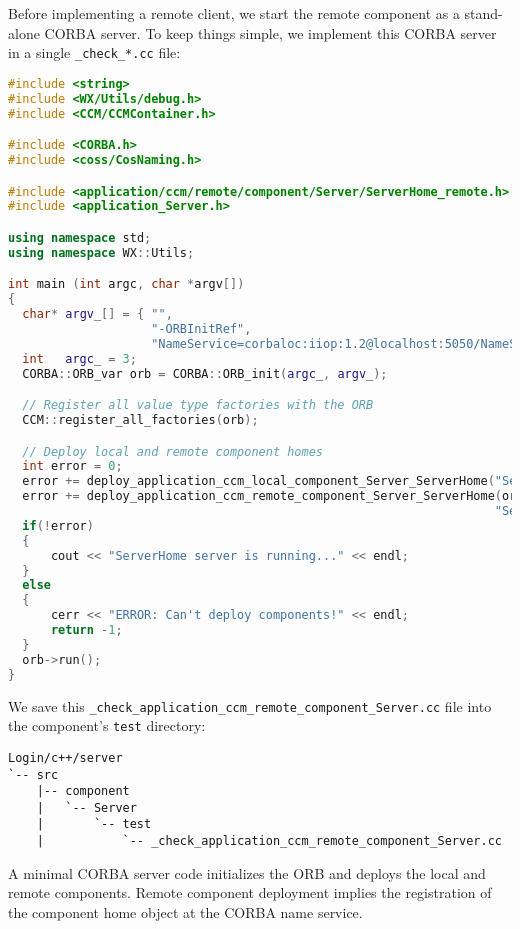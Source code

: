 Before implementing a remote client, we start the remote component as a
stand-alone CORBA server.
To keep things simple, we implement this CORBA server in a single 
{\tt \_check\_*.cc} file:
\begin{footnotesize}
\begin{lstlisting}[language=C++]
#include <string>
#include <WX/Utils/debug.h>
#include <CCM/CCMContainer.h>

#include <CORBA.h>
#include <coss/CosNaming.h>

#include <application/ccm/remote/component/Server/ServerHome_remote.h>
#include <application_Server.h>

using namespace std;
using namespace WX::Utils;

int main (int argc, char *argv[])
{
  char* argv_[] = { "", 
                    "-ORBInitRef", 
                    "NameService=corbaloc:iiop:1.2@localhost:5050/NameService"}; 
  int   argc_ = 3;
  CORBA::ORB_var orb = CORBA::ORB_init(argc_, argv_);

  // Register all value type factories with the ORB  
  CCM::register_all_factories(orb);

  // Deploy local and remote component homes	
  int error = 0;
  error += deploy_application_ccm_local_component_Server_ServerHome("ServerHome");
  error += deploy_application_ccm_remote_component_Server_ServerHome(orb, 
                                                                    "ServerHome");
  if(!error) 
  {
      cout << "ServerHome server is running..." << endl;
  }
  else 
  {
      cerr << "ERROR: Can't deploy components!" << endl;
      return -1;
  }
  orb->run();
}
\end{lstlisting}
\end{footnotesize}

We save this {\tt \_check\_application\_ccm\_remote\_component\_Server.cc} file
into the component's {\tt test} directory:
\begin{footnotesize}
\begin{verbatim}
Login/c++/server
`-- src
    |-- component
    |   `-- Server
    |       `-- test
    |           `-- _check_application_ccm_remote_component_Server.cc
\end{verbatim}
\end{footnotesize}

A minimal CORBA server code initializes the ORB and deploys the local and
remote components. Remote component deployment implies the registration of the
component home object at the CORBA name service. 

